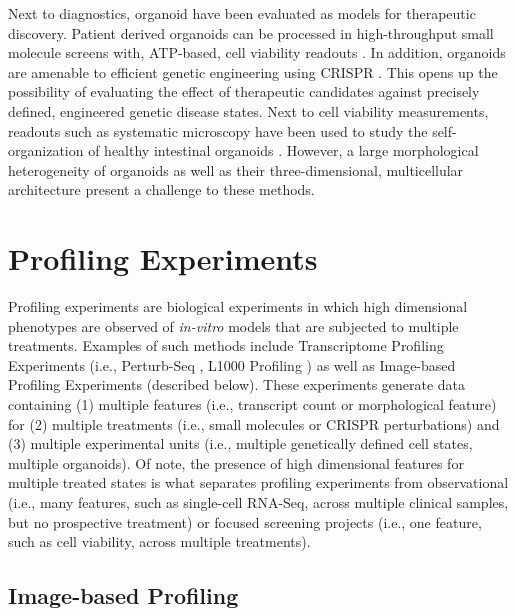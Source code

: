 \begin{flushleft}
Next to diagnostics, organoid have been evaluated as models for therapeutic discovery. Patient derived organoids can be processed in high-throughput small molecule screens with, ATP-based, cell viability readouts \parencite{vandeweteringProspectiveDerivationLiving2015, boehnkeAssayEstablishmentValidation2016a}. In addition, organoids are amenable to efficient genetic engineering using CRISPR \parencite{matanoModelingColorectalCancer2015a, drostSequentialCancerMutations2015}. This opens up the possibility of evaluating the effect of therapeutic candidates against precisely defined, engineered genetic disease states. Next to cell viability measurements, readouts such as systematic microscopy have been used to study the self-organization of healthy intestinal organoids \parencite{lukoninPhenotypicLandscapeIntestinal2020}. However, a large morphological heterogeneity of organoids as well as their three-dimensional, multicellular architecture present a challenge to these methods.

\section{Profiling Experiments} 

Profiling experiments are biological experiments in which high dimensional phenotypes are observed of \textit{in-vitro} models that are subjected to multiple treatments. Examples of such methods include Transcriptome Profiling Experiments (i.e., Perturb-Seq \parencite{dixitPerturbSeqDissectingMolecular2016}, L1000 Profiling \parencite{subramanianNextGenerationConnectivity2017}) as well as Image-based Profiling Experiments \parencite{caicedoApplicationsImagebasedProfiling2016} (described below). These experiments generate data containing (1) multiple features (i.e., transcript count or morphological feature) for (2) multiple treatments (i.e., small molecules or CRISPR perturbations) and (3) multiple experimental units (i.e., multiple genetically defined cell states, multiple organoids). Of note, the presence of high dimensional features for multiple treated states is what separates profiling experiments from observational (i.e., many features, such as single-cell RNA-Seq, across multiple clinical samples, but no prospective treatment) or focused screening projects (i.e., one feature, such as cell viability, across multiple treatments). 

\subsection{Image-based Profiling}


\end{flushleft}
